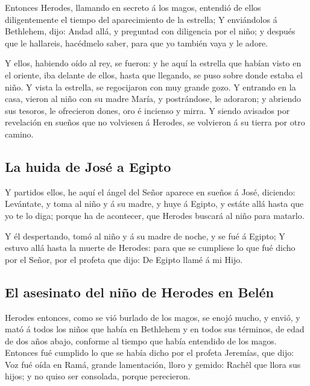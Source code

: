  Entonces Herodes, llamando en secreto á los magos, entendió
de ellos diligentemente el tiempo del aparecimiento de la estrella;
 Y enviándolos á Bethlehem, dijo: Andad allá, y preguntad
con diligencia por el niño; y después que le hallareis, hacédmelo saber,
para que yo también vaya y le adore.

 Y ellos, habiendo oído al rey, se fueron: y he aquí la
estrella que habían visto en el oriente, iba delante de ellos, hasta que
llegando, se puso sobre donde estaba el niño.  Y vista la
estrella, se regocijaron con muy grande gozo.  Y entrando
en la casa, vieron al niño con su madre María, y postrándose, le
adoraron; y abriendo sus tesoros, le ofrecieron dones, oro é incienso y
mirra.  Y siendo avisados por revelación en sueños que no
volviesen á Herodes, se volvieron á su tierra por otro camino.

\hypertarget{la-huida-de-josuxe9-a-egipto}{%
\subsection{La huida de José a
Egipto}\label{la-huida-de-josuxe9-a-egipto}}

 Y partidos ellos, he aquí el ángel del Señor aparece en
sueños á José, diciendo: Levántate, y toma al niño y á su madre, y huye
á Egipto, y estáte allá hasta que yo te lo diga; porque ha de acontecer,
que Herodes buscará al niño para matarlo.

 Y él despertando, tomó al niño y á su madre de noche, y se
fué á Egipto;  Y estuvo allá hasta la muerte de Herodes:
para que se cumpliese lo que fué dicho por el Señor, por el profeta que
dijo: De Egipto llamé á mi Hijo.

\hypertarget{el-asesinato-del-niuxf1o-de-herodes-en-beluxe9n}{%
\subsection{El asesinato del niño de Herodes en
Belén}\label{el-asesinato-del-niuxf1o-de-herodes-en-beluxe9n}}

 Herodes entonces, como se vió burlado de los magos, se
enojó mucho, y envió, y mató á todos los niños que había en Bethlehem y
en todos sus términos, de edad de dos años abajo, conforme al tiempo que
había entendido de los magos.  Entonces fué cumplido lo que
se había dicho por el profeta Jeremías, que dijo:  Voz fué
oída en Ramá, grande lamentación, lloro y gemido: Rachêl que llora sus
hijos; y no quiso ser consolada, porque perecieron.

